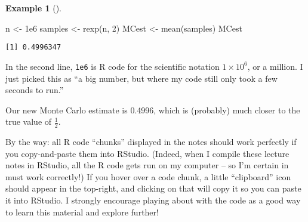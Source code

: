 \documentclass[
  letterpaper,
  DIV=11,
  numbers=noendperiod]{scrreprt}
\newenvironment{Shaded}{\begin{snugshade}}{\end{snugshade}}
\newcommand{\DecValTok}[1]{\textcolor[rgb]{0.68,0.00,0.00}{#1}}
\newcommand{\FloatTok}[1]{\textcolor[rgb]{0.68,0.00,0.00}{#1}}
\newcommand{\FunctionTok}[1]{\textcolor[rgb]{0.28,0.35,0.67}{#1}}
\newcommand{\NormalTok}[1]{\textcolor[rgb]{0.00,0.23,0.31}{#1}}
\newcommand{\OtherTok}[1]{\textcolor[rgb]{0.00,0.23,0.31}{#1}}
\theoremstyle{plain}
\theoremstyle{definition}
\theoremstyle{definition}
\newtheorem{example}{Example}[chapter]
\theoremstyle{remark}
\begin{document}
\begin{example}[]
\begin{Shaded}
\begin{Highlighting}[]
\NormalTok{n }\OtherTok{\textless{}{-}} \FloatTok{1e6}
\NormalTok{samples }\OtherTok{\textless{}{-}} \FunctionTok{rexp}\NormalTok{(n, }\DecValTok{2}\NormalTok{)}
\NormalTok{MCest }\OtherTok{\textless{}{-}} \FunctionTok{mean}\NormalTok{(samples)}
\NormalTok{MCest}
\end{Highlighting}
\end{Shaded}

\begin{verbatim}
[1] 0.4996347
\end{verbatim}

In the second line, \texttt{1e6} is R code for the scientific notation
\(1 \times 10^6\), or a million. I just picked this as ``a big number,
but where my code still only took a few seconds to run.''

Our new Monte Carlo estimate is 0.4996, which is (probably) much closer
to the true value of \(\frac12\).

\end{example}

By the way: all R code ``chunks'' displayed in the notes should work
perfectly if you copy-and-paste them into RStudio. (Indeed, when I
compile these lecture notes in RStudio, all the R code gets run on my
computer -- so I'm certain in must work correctly!) If you hover over a
code chunk, a little ``clipboard'' icon should appear in the top-right,
and clicking on that will copy it so you can paste it into RStudio. I
strongly encourage playing about with the code as a good way to learn
this material and explore further!
\end{document}
